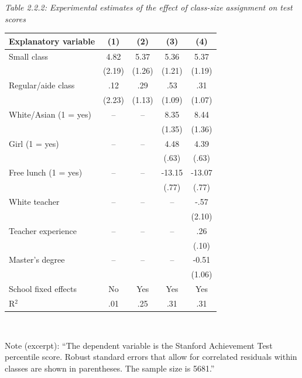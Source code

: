 \documentclass[11pt,a4paper]{article}
\begin{document}
\begin{center}
\medskip
\textit{Table 2.2.2: Experimental estimates of the effect of class-size assignment on test scores}\\[2pt]
\begin{tabular}{lcccc}
\toprule
Explanatory variable & (1) & (2) & (3) & (4)\\
\midrule
Small class & 4.82 & 5.37 & 5.36 & 5.37\\
 & (2.19) & (1.26) & (1.21) & (1.19)\\
Regular/aide class & .12 & .29 & .53 & .31\\
 & (2.23) & (1.13) & (1.09) & (1.07)\\
White/Asian (1 = yes) & -- & -- & 8.35 & 8.44\\
 & & & (1.35) & (1.36)\\
Girl (1 = yes) & -- & -- & 4.48 & 4.39\\
 & & & (.63) & (.63)\\
Free lunch (1 = yes) & -- & -- & -13.15 & -13.07\\
 & & & (.77) & (.77)\\
White teacher & -- & -- & -- & -.57\\
 & & & & (2.10)\\
Teacher experience & -- & -- & -- & .26\\
 & & & & (.10)\\
Master's degree & -- & -- & -- & -0.51\\
 & & & & (1.06)\\
School fixed effects & No & Yes & Yes & Yes\\
R$^2$ & .01 & .25 & .31 & .31\\
\bottomrule
\end{tabular}\\[2pt]
\parbox{0.9\linewidth}{\footnotesize Note (excerpt): ``The dependent variable is the Stanford Achievement Test
percentile score. Robust standard errors that allow for correlated residuals within classes are shown
in parentheses. The sample size is 5681.''}
\end{center}
\end{document}
